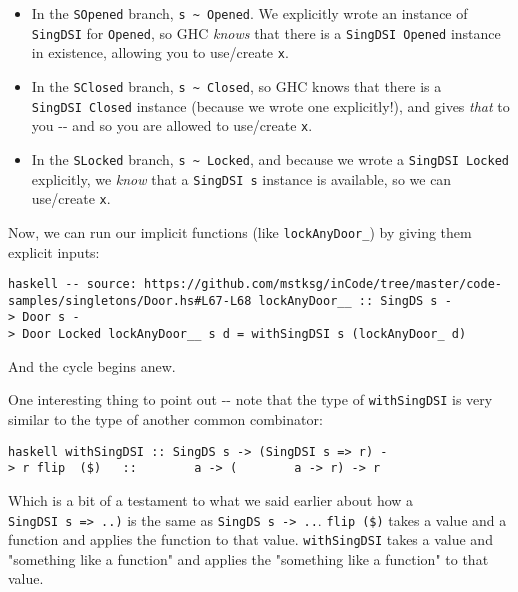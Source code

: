 \documentclass[]{article}
\begin{document}
\begin{itemize}
\tightlist
\item
  In the \texttt{SOpened} branch,
  \texttt{s\ \textasciitilde{}\ \textquotesingle{}Opened}. We explicitly wrote
  an instance of \texttt{SingDSI} for \texttt{\textquotesingle{}Opened}, so GHC
  \emph{knows} that there is a \texttt{SingDSI\ \textquotesingle{}Opened}
  instance in existence, allowing you to use/create \texttt{x}.
\item
  In the \texttt{SClosed} branch,
  \texttt{s\ \textasciitilde{}\ \textquotesingle{}Closed}, so GHC knows that
  there is a \texttt{SingDSI\ \textquotesingle{}Closed} instance (because we
  wrote one explicitly!), and gives \emph{that} to you -\/- and so you are
  allowed to use/create \texttt{x}.
\item
  In the \texttt{SLocked} branch,
  \texttt{s\ \textasciitilde{}\ \textquotesingle{}Locked}, and because we wrote
  a \texttt{SingDSI\ \textquotesingle{}Locked} explicitly, we \emph{know} that a
  \texttt{SingDSI\ s} instance is available, so we can use/create \texttt{x}.
\end{itemize}

Now, we can run our implicit functions (like \texttt{lockAnyDoor\_}) by giving
them explicit inputs:

\texttt{haskell\ -\/-\ source:\ https://github.com/mstksg/inCode/tree/master/code-samples/singletons/Door.hs\#L67-L68\ lockAnyDoor\_\_\ ::\ SingDS\ s\ -\textgreater{}\ Door\ s\ -\textgreater{}\ Door\ \textquotesingle{}Locked\ lockAnyDoor\_\_\ s\ d\ =\ withSingDSI\ s\ (lockAnyDoor\_\ d)}

And the cycle begins anew.

One interesting thing to point out -\/- note that the type of
\texttt{withSingDSI} is very similar to the type of another common combinator:

\texttt{haskell\ withSingDSI\ ::\ SingDS\ s\ -\textgreater{}\ (SingDSI\ s\ =\textgreater{}\ r)\ -\textgreater{}\ r\ flip\ \ (\$)\ \ \ ::\ \ \ \ \ \ \ \ a\ -\textgreater{}\ (\ \ \ \ \ \ \ \ a\ -\textgreater{}\ r)\ -\textgreater{}\ r}

Which is a bit of a testament to what we said earlier about how a
\texttt{SingDSI\ s\ =\textgreater{}\ ..)} is the same as
\texttt{SingDS\ s\ -\textgreater{}\ ..}. \texttt{flip\ (\$)} takes a value and a
function and applies the function to that value. \texttt{withSingDSI} takes a
value and "something like a function" and applies the "something like a
function" to that value.
\end{document}
